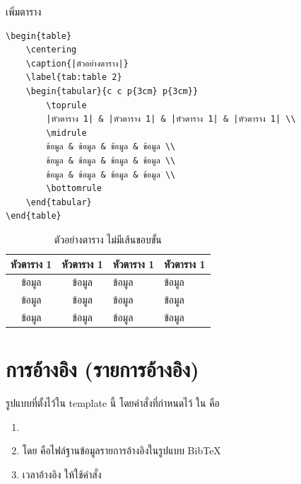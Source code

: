 \newpage
\begin{exampleBox}{เพิ่มตาราง}
\begin{lstlisting}[frame=none]
\begin{table}
    \centering
    \caption{|ตัวอย่างตาราง|}
    \label{tab:table 2}
    \begin{tabular}{c c p{3cm} p{3cm}}
        \toprule
        |หัวตาราง 1| & |หัวตาราง 1| & |หัวตาราง 1| & |หัวตาราง 1| \\
        \midrule
        ข้อมูล & ข้อมูล & ข้อมูล & ข้อมูล \\
        ข้อมูล & ข้อมูล & ข้อมูล & ข้อมูล \\
        ข้อมูล & ข้อมูล & ข้อมูล & ข้อมูล \\
        \bottomrule
    \end{tabular}
\end{table}
\end{lstlisting}
\tcblower
\begin{table}[H]
    \centering
    \caption{ตัวอย่างตาราง ไม่มีเส้นขอบขั้น}
    \label{tab:table 2}
    \begin{tabular}{c c p{3cm} p{3cm}}
        \toprule
        หัวตาราง 1 & หัวตาราง 1 & หัวตาราง 1 & หัวตาราง 1 \\
        \midrule
        ข้อมูล & ข้อมูล & ข้อมูล & ข้อมูล \\
        ข้อมูล & ข้อมูล & ข้อมูล & ข้อมูล \\
        ข้อมูล & ข้อมูล & ข้อมูล & ข้อมูล \\
        \bottomrule
    \end{tabular}
\end{table}
\end{exampleBox}

\newpage
\section{การอ้างอิง (รายการอ้างอิง)}
รูปแบบที่ตั้งไว้ใน template นี้ โดยคำสั่งที่กำหนดไว้ ใน  คือ
\begin{enumerate}
    \item \latex{\usepackage[backend=biber,style=ieee,bibencoding=utf8]{biblatex}}
    \item \latex{} โดย  คือไฟล์ฐานข้อมูลรายการอ้างอิงในรูปแบบ BibTeX
    \item เวลาอ้างอิง ให้ใช้คำสั่ง 
\end{enumerate}

